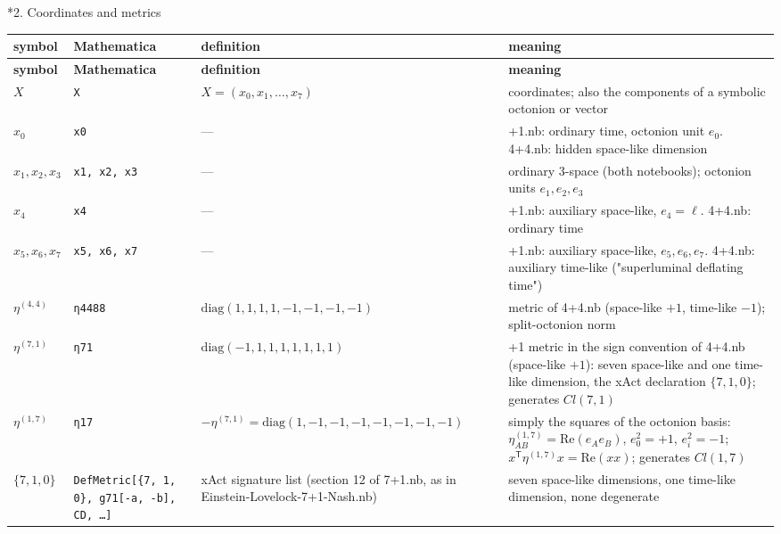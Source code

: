 \documentclass[10pt,a4paper]{article}
\makeatletter
\renewcommand\section{\@startsection{section}{1}{\z@}{-3.5ex \@plus -1ex \@minus -.2ex}{2.3ex \@plus.2ex}{\normalfont\Large\bfseries\raggedright}}
\makeatother
\begin{document}
\section*{2. Coordinates and metrics}
{\small
\begin{longtable}{>{\raggedright\arraybackslash}p{}>{\raggedright\arraybackslash}p{}>{\raggedright\arraybackslash}p{}>{\raggedright\arraybackslash}p{}}
\toprule
\textbf{symbol} & \textbf{Mathematica} & \textbf{definition} & \textbf{meaning} \\
\midrule\endfirsthead
\toprule
\textbf{symbol} & \textbf{Mathematica} & \textbf{definition} & \textbf{meaning} \\
\midrule\endhead
\endfoot
\bottomrule\endlastfoot
$X$ & \texttt{X} & $X=(x_0,x_1,\dots,x_7)$ & coordinates; also the components of a symbolic octonion or vector \\
$x_0$ & \texttt{x0} & — & 7+1.nb: ordinary time, octonion unit $e_0$. 4+4.nb: hidden space-like dimension \\
$x_1,x_2,x_3$ & \texttt{x1, x2, x3} & — & ordinary 3-space (both notebooks); octonion units $e_1,e_2,e_3$ \\
$x_4$ & \texttt{x4} & — & 7+1.nb: auxiliary space-like, $e_4=\ell$. 4+4.nb: ordinary time \\
$x_5,x_6,x_7$ & \texttt{x5, x6, x7} & — & 7+1.nb: auxiliary space-like, $e_5,e_6,e_7$. 4+4.nb: auxiliary time-like ("superluminal deflating time") \\
$\eta^{(4,4)}$ & \texttt{η4488} & $\mathrm{diag}(1,1,1,1,-1,-1,-1,-1)$ & metric of 4+4.nb (space-like $+1$, time-like $-1$); split-octonion norm \\
$\eta^{(7,1)}$ & \texttt{η71} & $\mathrm{diag}(-1,1,1,1,1,1,1,1)$ & 7+1 metric in the sign convention of 4+4.nb (space-like $+1$): seven space-like and one time-like dimension, the xAct declaration $\{7,1,0\}$; generates $Cl(7,1)$ \\
$\eta^{(1,7)}$ & \texttt{η17} & $-\eta^{(7,1)}=\mathrm{diag}(1,-1,-1,-1,-1,-1,-1,-1)$ & simply the squares of the octonion basis: $\eta^{(1,7)}_{AB}=\mathrm{Re}(e_Ae_B)$, $e_0^2=+1$, $e_i^2=-1$; $x^{\mathsf T}\eta^{(1,7)}x=\mathrm{Re}(xx)$; generates $Cl(1,7)$ \\
$\{7,1,0\}$ & \texttt{DefMetric[\{7, 1, 0\}, g71[-a, -b], CD, …]} & xAct signature list (section 12 of 7+1.nb, as in Einstein-Lovelock-7+1-Nash.nb) & seven space-like dimensions, one time-like dimension, none degenerate \\

\end{longtable}}
\end{document}
